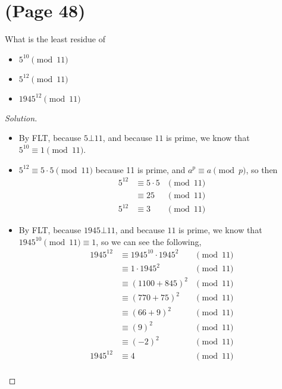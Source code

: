 \documentclass[11pt]{article}
\newenvironment{problem}[2][Problem]{\begin{trivlist}
\item[\hskip \labelsep {\bfseries #1}\hskip \labelsep {\bfseries #2.}]}{\end{trivlist}}
\newenvironment{solution}
  {\renewcommand\qedsymbol{$~$}\begin{proof}[Solution]$ $\par\nobreak\ignorespaces}
  {\end{proof}}
\begin{document}
\section{(Page 48)}

\begin{problem}{2}
What is the least residue of
\begin{itemize}
    \item [(a)] $5^{10} \pmod{11}$
    \item [(b)] $5^{12} \pmod{11}$
    \item [(c)] $1945^{12} \pmod{11}$
\end{itemize}
\end{problem}

\begin{solution}
    \begin{itemize}
        \item [(a)] By FLT, because $5\bot 11$, and because $11$ is prime, we know that $5^{10}  \equiv 1\pmod{11}$.
        \item [(b)] $5^{12}\equiv 5\cdot 5 \pmod{11}$ because 11 is prime, and $a^{p}\equiv a\pmod{p}$, so then
              \[
                  \begin{array}{rlc}
                      5^{12} & \equiv 5\cdot 5 & \pmod{11} \\
                             & \equiv 25       & \pmod{11} \\
                      5^{12} & \equiv 3        & \pmod{11}
                  \end{array}
              \]
        \item [(c)] By FLT, because $1945\bot 11$, and because $11$ is prime, we know that $1945^{10} \pmod{11} \equiv 1$, so we can see the following,
              \[
                  \begin{array}{rlc}
                      1945^{12} & \equiv 1945^{10} \cdot 1945^2 & \pmod{11} \\
                                & \equiv 1 \cdot 1945^2         & \pmod{11} \\
                                & \equiv (1100+845)^2           & \pmod{11} \\
                                & \equiv (770 + 75)^2           & \pmod{11} \\
                                & \equiv (66 + 9)^2             & \pmod{11} \\
                                & \equiv (9)^2                  & \pmod{11} \\
                                & \equiv (-2)^2                 & \pmod{11} \\
                      1945^{12} & \equiv 4                      & \pmod{11} \\
                  \end{array}
              \]
    \end{itemize}
\end{solution}
\end{document}
